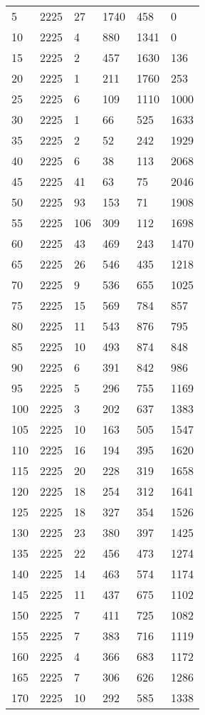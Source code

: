 \begin{longtable}{|l|l|l|l|l|l|}
5 & 2225 & 27 & 1740 & 458 & 0 \\
10 & 2225 & 4 & 880 & 1341 & 0 \\
15 & 2225 & 2 & 457 & 1630 & 136 \\
20 & 2225 & 1 & 211 & 1760 & 253 \\
25 & 2225 & 6 & 109 & 1110 & 1000 \\
30 & 2225 & 1 & 66 & 525 & 1633 \\
35 & 2225 & 2 & 52 & 242 & 1929 \\
40 & 2225 & 6 & 38 & 113 & 2068 \\
45 & 2225 & 41 & 63 & 75 & 2046 \\
50 & 2225 & 93 & 153 & 71 & 1908 \\
55 & 2225 & 106 & 309 & 112 & 1698 \\
60 & 2225 & 43 & 469 & 243 & 1470 \\
65 & 2225 & 26 & 546 & 435 & 1218 \\
70 & 2225 & 9 & 536 & 655 & 1025 \\
75 & 2225 & 15 & 569 & 784 & 857 \\
80 & 2225 & 11 & 543 & 876 & 795 \\
85 & 2225 & 10 & 493 & 874 & 848 \\
90 & 2225 & 6 & 391 & 842 & 986 \\
95 & 2225 & 5 & 296 & 755 & 1169 \\
100 & 2225 & 3 & 202 & 637 & 1383 \\
105 & 2225 & 10 & 163 & 505 & 1547 \\
110 & 2225 & 16 & 194 & 395 & 1620 \\
115 & 2225 & 20 & 228 & 319 & 1658 \\
120 & 2225 & 18 & 254 & 312 & 1641 \\
125 & 2225 & 18 & 327 & 354 & 1526 \\
130 & 2225 & 23 & 380 & 397 & 1425 \\
135 & 2225 & 22 & 456 & 473 & 1274 \\
140 & 2225 & 14 & 463 & 574 & 1174 \\
145 & 2225 & 11 & 437 & 675 & 1102 \\
150 & 2225 & 7 & 411 & 725 & 1082 \\
155 & 2225 & 7 & 383 & 716 & 1119 \\
160 & 2225 & 4 & 366 & 683 & 1172 \\
165 & 2225 & 7 & 306 & 626 & 1286 \\
170 & 2225 & 10 & 292 & 585 & 1338 \\

\end{longtable}
